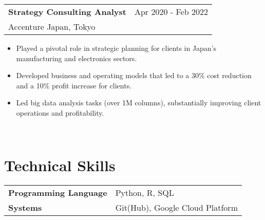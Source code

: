 \documentclass[11pt, a4paper]{article}
\begin{document}
\newpage
\noindent
\begin{tabular}{@{}p{}p{}}
\textbf{Strategy Consulting Analyst} & \hfill Apr 2020 - Feb 2022 \\
Accenture Japan, Tokyo \\
\end{tabular}
\begin{itemize}[noitemsep, topsep=0pt] %
    \item Played a pivotal role in strategic planning for clients in Japan's manufacturing and electronics sectors.
    \item Developed business and operating models that led to a 30\% cost reduction and a 10\% profit increase for clients.
    \item Led big data analysis tasks (over 1M columns), substantially improving client operations and profitability.
\end{itemize} \\

\section*{Technical Skills}
\begin{tabular}{@{}p{}p{}}
\textbf{Programming Language} & Python, R, SQL \\
\textbf{Systems} & Git(Hub), Google Cloud Platform \\
\end{tabular}
\end{document}
